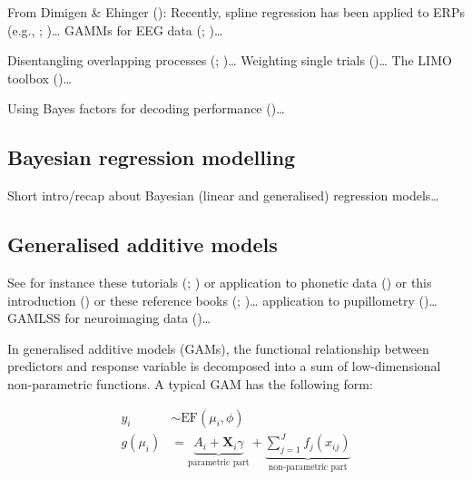 \documentclass[
  doc,
  floatsintext,
  longtable,
  a4paper,
  nolmodern,
  notxfonts,
  notimes,
  colorlinks=true,linkcolor=blue,citecolor=blue,urlcolor=blue]{apa7}
\begin{document}
From Dimigen \& Ehinger (): Recently,
spline regression has been applied to ERPs (e.g.,
;
)\ldots{} GAMMs
for EEG data (;
)\ldots{}

Disentangling overlapping processes
(;
)\ldots{}
Weighting single trials ()\ldots{} The LIMO toolbox ()\ldots{}

Using Bayes factors for decoding performance
()\ldots{}

\subsection{Bayesian regression
modelling}\label{bayesian-regression-modelling}

Short intro/recap about Bayesian (linear and generalised) regression
models\ldots{}

\subsection{Generalised additive
models}\label{generalised-additive-models}

See for instance these tutorials
(;
) or application to
phonetic data () or this
introduction () or these
reference books (;
)\ldots{} application to
pupillometry ()\ldots{}
GAMLSS for neuroimaging data ()\ldots{}

In generalised additive models (GAMs), the functional relationship
between predictors and response variable is decomposed into a sum of
low-dimensional non-parametric functions. A typical GAM has the
following form:

\[
\begin{aligned} 
y_{i} &\sim \mathrm{EF}\left(\mu_{i}, \phi\right)\\
g\left(\mu_i\right) &=  \underbrace{A_{i} + \mathbf{X}_{i} \gamma}_{\text{parametric part}} + \underbrace{\sum_{j=1}^{J} f_{j}\left(x_{ij}\right)}_{\text{non-parametric part}}
\end{aligned}
\]
\end{document}
